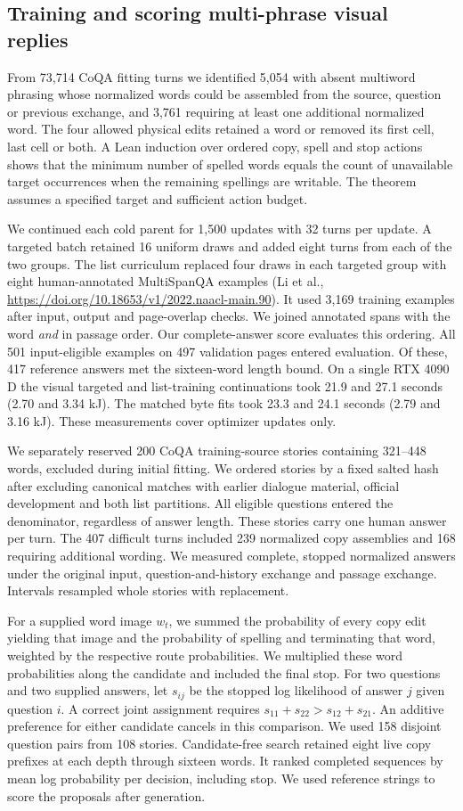 \subsection*{Training and scoring multi-phrase visual replies}
From 73,714 CoQA fitting turns we identified 5,054 with absent multiword phrasing whose normalized words could be assembled from the source, question or previous exchange, and 3,761 requiring at least one additional normalized word. The four allowed physical edits retained a word or removed its first cell, last cell or both. A Lean induction over ordered copy, spell and stop actions shows that the minimum number of spelled words equals the count of unavailable target occurrences when the remaining spellings are writable. The theorem assumes a specified target and sufficient action budget.

We continued each cold parent for 1,500 updates with 32 turns per update. A targeted batch retained 16 uniform draws and added eight turns from each of the two groups. The list curriculum replaced four draws in each targeted group with eight human-annotated MultiSpanQA examples (Li et al., \url{https://doi.org/10.18653/v1/2022.naacl-main.90}). It used 3,169 training examples after input, output and page-overlap checks. We joined annotated spans with the word \emph{and} in passage order. Our complete-answer score evaluates this ordering. All 501 input-eligible examples on 497 validation pages entered evaluation. Of these, 417 reference answers met the sixteen-word length bound. On a single RTX 4090 D the visual targeted and list-training continuations took 21.9 and 27.1 seconds (2.70 and 3.34 kJ). The matched byte fits took 23.3 and 24.1 seconds (2.79 and 3.16 kJ). These measurements cover optimizer updates only.

We separately reserved 200 CoQA training-source stories containing 321--448 words, excluded during initial fitting. We ordered stories by a fixed salted hash after excluding canonical matches with earlier dialogue material, official development and both list partitions. All eligible questions entered the denominator, regardless of answer length. These stories carry one human answer per turn. The 407 difficult turns included 239 normalized copy assemblies and 168 requiring additional wording. We measured complete, stopped normalized answers under the original input, question-and-history exchange and passage exchange. Intervals resampled whole stories with replacement.

For a supplied word image $w_t$, we summed the probability of every copy edit yielding that image and the probability of spelling and terminating that word, weighted by the respective route probabilities. We multiplied these word probabilities along the candidate and included the final stop. For two questions and two supplied answers, let $s_{ij}$ be the stopped log likelihood of answer $j$ given question $i$. A correct joint assignment requires $s_{11}+s_{22}>s_{12}+s_{21}$. An additive preference for either candidate cancels in this comparison. We used 158 disjoint question pairs from 108 stories. Candidate-free search retained eight live copy prefixes at each depth through sixteen words. It ranked completed sequences by mean log probability per decision, including stop. We used reference strings to score the proposals after generation.
